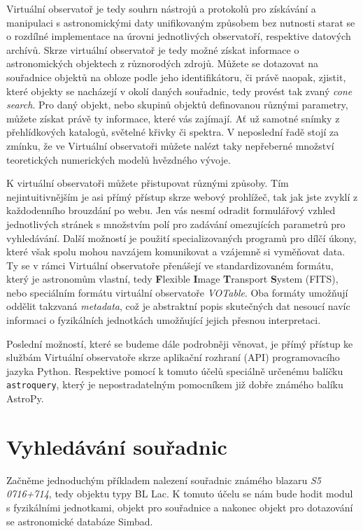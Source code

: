 \documentclass{report}
\begin{document}
    Virtuální observatoř je tedy souhrn nástrojů a protokolů pro získávání a
manipulaci s astronomickými daty unifikovaným způsobem bez nutnosti
starat se o rozdílné implementace na úrovni jednotlivých observatoří,
respektive datových archívů. Skrze virtuální observatoř je tedy možné
získat informace o astronomických objektech z různorodých zdrojů. Můžete
se dotazovat na souřadnice objektů na obloze podle jeho identifikátoru,
či právě naopak, zjistit, které objekty se nacházejí v okolí daných
souřadnic, tedy provést tak zvaný \emph{cone search}. Pro daný objekt,
nebo skupinů objektů definovanou různými parametry, můžete získat právě
ty informace, které vás zajímají. Ať už samotné snímky z přehlídkových
katalogů, světelné křivky či spektra. V neposlední řadě stojí za zmínku,
že ve Virtuální observatoři můžete nalézt taky nepřeberné množství
teoretických numerických modelů hvězdného vývoje.

    K virtuální observatoři můžete přistupovat různými způsoby. Tím
nejintuitivnějším je asi přímý přístup skrze webový prohlížeč, tak jak
jste zvyklí z každodenního brouzdání po webu. Jen vás nesmí odradit
formulářový vzhled jednotlivých stránek s množstvím polí pro zadávání
omezujících parametrů pro vyhledávání. Další možností je použití
specializovaných programů pro dílčí úkony, které však spolu mohou
navzájem komunikovat a vzájemně si vyměňovat data. Ty se v rámci
Virtuální observatoře přenášejí ve standardizovaném formátu, který je
astronomům vlastní, tedy \textbf{F}lexible \textbf{I}mage
\textbf{T}ransport \textbf{S}ystem (FITS), nebo speciálním formátu
virtuální observatoře \emph{VOTable}. Oba formáty umožňují oddělit
takzvaná \emph{metadata}, což je abstraktní popis skutečných dat nesoucí
navíc informaci o fyzikálních jednotkách umožňující jejich přesnou
interpretaci.

    Poslední možností, které se budeme dále podrobněji věnovat, je přímý
přístup ke službám Virtuální observatoře skrze aplikační rozhraní (API)
programovacího jazyka Python. Respektive pomocí k tomuto účelů speciálně
určenému balíčku \texttt{astroquery}, který je nepostradatelným
pomocníkem již dobře známého balíku AstroPy.

    \section*{Vyhledávání souřadnic}\label{vyhleduxe1vuxe1nuxed-souux159adnic}

    Začněme jednoduchým příkladem nalezení souřadnic známého blazaru
\emph{S5 0716+714}, tedy objektu typy BL Lac. K tomuto účelu se nám bude
hodit modul s fyzikálními jednotkami, objekt pro souřadnice a nakonec
objekt pro dotazování se astronomické databáze Simbad.
\end{document}
